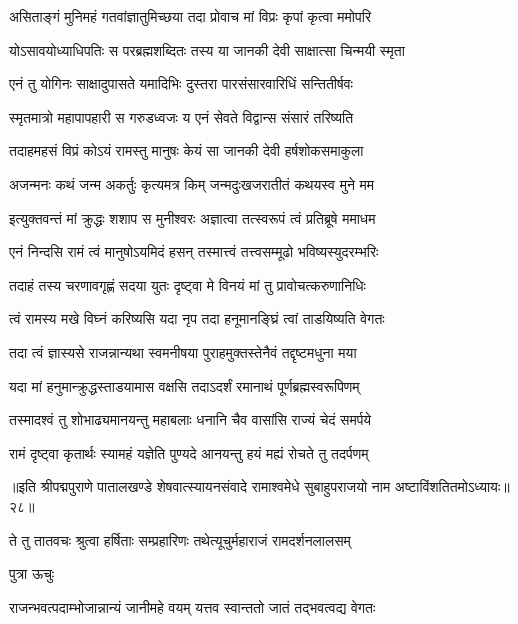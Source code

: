 \twolineshloka
{असिताङ्गं मुनिमहं गतवांज्ञातुमिच्छया}
{तदा प्रोवाच मां विप्रः कृपां कृत्वा ममोपरि}%

\twolineshloka
{योऽसावयोध्याधिपतिः स परब्रह्मशब्दितः}
{तस्य या जानकी देवी साक्षात्सा चिन्मयी स्मृता}%

\twolineshloka
{एनं तु योगिनः साक्षादुपासते यमादिभिः}
{दुस्तरा पारसंसारवारिधिं सन्तितीर्षवः}%

\twolineshloka
{स्मृतमात्रो महापापहारी स गरुडध्वजः}
{य एनं सेवते विद्वान्स संसारं तरिष्यति}%

\twolineshloka
{तदाहमहसं विप्रं कोऽयं रामस्तु मानुषः}
{केयं सा जानकी देवी हर्षशोकसमाकुला}%

\twolineshloka
{अजन्मनः कथं जन्म अकर्तुः कृत्यमत्र किम्}
{जन्मदुःखजरातीतं कथयस्व मुने मम}%

\twolineshloka
{इत्युक्तवन्तं मां क्रुद्धः शशाप स मुनीश्वरः}
{अज्ञात्वा तत्स्वरूपं त्वं प्रतिब्रूषे ममाधम}%

\twolineshloka
{एनं निन्दसि रामं त्वं मानुषोऽयमिदं हसन्}
{तस्मात्त्वं तत्त्वसम्मूढो भविष्यस्युदरम्भरिः}%

\twolineshloka
{तदाहं तस्य चरणावगृह्णं सदया युतः}
{दृष्ट्वा मे विनयं मां तु प्रावोचत्करुणानिधिः}%

\twolineshloka
{त्वं रामस्य मखे विघ्नं करिष्यसि यदा नृप}
{तदा हनूमानङ्घ्रिं त्वां ताडयिष्यति वेगतः}%

\twolineshloka
{तदा त्वं ज्ञास्यसे राजन्नान्यथा स्वमनीषया}
{पुराहमुक्तस्तेनैवं तद्दृष्टमधुना मया}%

\twolineshloka
{यदा मां हनुमान्क्रुद्धस्ताडयामास वक्षसि}
{तदाऽदर्शं रमानाथं पूर्णब्रह्मस्वरूपिणम्}%

\twolineshloka
{तस्मादश्वं तु शोभाढ्यमानयन्तु महाबलाः}
{धनानि चैव वासांसि राज्यं चेदं समर्पये}%

\twolineshloka
{रामं दृष्ट्वा कृतार्थः स्यामहं यज्ञेति पुण्यदे}
{आनयन्तु हयं मह्यं रोचते तु तदर्पणम्}%

॥इति श्रीपद्मपुराणे पातालखण्डे शेषवात्स्यायनसंवादे रामाश्वमेधे सुबाहुपराजयो नाम अष्टाविंशतितमोऽध्यायः॥२८॥



\twolineshloka
{ते तु तातवचः श्रुत्वा हर्षिताः सम्प्रहारिणः}
{तथेत्यूचुर्महाराजं रामदर्शनलालसम्}%

पुत्रा ऊचुः

\twolineshloka
{राजन्भवत्पदाम्भोजान्नान्यं जानीमहे वयम्}
{यत्तव स्वान्ततो जातं तद्भवत्वद्य वेगतः}%

